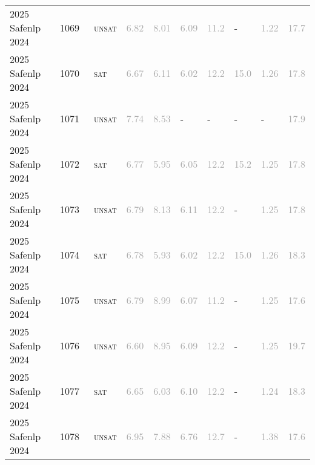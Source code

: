 \begin{center}
{\begin{longtable}{@{}llllllllll@{}}
2025 Safenlp 2024 & 1069 & ~\textsc{unsat} & \textcolor{darkgray}{6.82} & \textcolor{darkgray}{8.01} & \textcolor{darkgray}{6.09} & \textcolor{darkgray}{11.2} & - & \textcolor{darkgray}{1.22} & \textcolor{darkgray}{17.7} \\
2025 Safenlp 2024 & 1070 & ~\textsc{sat} & \textcolor{darkgray}{6.67} & \textcolor{darkgray}{6.11} & \textcolor{darkgray}{6.02} & \textcolor{darkgray}{12.2} & \textcolor{darkgray}{15.0} & \textcolor{darkgray}{1.26} & \textcolor{darkgray}{17.8} \\
2025 Safenlp 2024 & 1071 & ~\textsc{unsat} & \textcolor{darkgray}{7.74} & \textcolor{darkgray}{8.53} & - & - & - & - & \textcolor{darkgray}{17.9} \\
2025 Safenlp 2024 & 1072 & ~\textsc{sat} & \textcolor{darkgray}{6.77} & \textcolor{darkgray}{5.95} & \textcolor{darkgray}{6.05} & \textcolor{darkgray}{12.2} & \textcolor{darkgray}{15.2} & \textcolor{darkgray}{1.25} & \textcolor{darkgray}{17.8} \\
2025 Safenlp 2024 & 1073 & ~\textsc{unsat} & \textcolor{darkgray}{6.79} & \textcolor{darkgray}{8.13} & \textcolor{darkgray}{6.11} & \textcolor{darkgray}{12.2} & - & \textcolor{darkgray}{1.25} & \textcolor{darkgray}{17.8} \\
2025 Safenlp 2024 & 1074 & ~\textsc{sat} & \textcolor{darkgray}{6.78} & \textcolor{darkgray}{5.93} & \textcolor{darkgray}{6.02} & \textcolor{darkgray}{12.2} & \textcolor{darkgray}{15.0} & \textcolor{darkgray}{1.26} & \textcolor{darkgray}{18.3} \\
2025 Safenlp 2024 & 1075 & ~\textsc{unsat} & \textcolor{darkgray}{6.79} & \textcolor{darkgray}{8.99} & \textcolor{darkgray}{6.07} & \textcolor{darkgray}{11.2} & - & \textcolor{darkgray}{1.25} & \textcolor{darkgray}{17.6} \\
2025 Safenlp 2024 & 1076 & ~\textsc{unsat} & \textcolor{darkgray}{6.60} & \textcolor{darkgray}{8.95} & \textcolor{darkgray}{6.09} & \textcolor{darkgray}{12.2} & - & \textcolor{darkgray}{1.25} & \textcolor{darkgray}{19.7} \\
2025 Safenlp 2024 & 1077 & ~\textsc{sat} & \textcolor{darkgray}{6.65} & \textcolor{darkgray}{6.03} & \textcolor{darkgray}{6.10} & \textcolor{darkgray}{12.2} & - & \textcolor{darkgray}{1.24} & \textcolor{darkgray}{18.3} \\
2025 Safenlp 2024 & 1078 & ~\textsc{unsat} & \textcolor{darkgray}{6.95} & \textcolor{darkgray}{7.88} & \textcolor{darkgray}{6.76} & \textcolor{darkgray}{12.7} & - & \textcolor{darkgray}{1.38} & \textcolor{darkgray}{17.6} \\

\end{longtable}}
\end{center}
